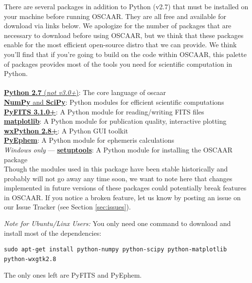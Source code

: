 \documentclass[a4paper]{article}
\begin{document}
There are several packages in addition to Python (v2.7) that must be installed on your machine before running OSCAAR. They are all free and available for download via links below. We apologize for the number of packages that are necessary to download before using OSCAAR, but we think that these packages enable for the most efficient open-source distro that we can provide.  We think you'll find that if you're going to build on the code within OSCAAR, this palette of packages provides most of the tools you need for scientific computation in Python. \\ \\
\noindent
\indent \href{http://www.python.org/getit/}{\textbf{Python 2.7} (\textit{not v3.0+})}: The core language of oscaar \\
\indent \href{http://new.scipy.org/download.html}{\textbf{NumPy} and \textbf{SciPy}}: Python modules for efficient scientific computations \\
\indent \href{http://www.stsci.edu/resources/software_hardware/pyfits/}{\textbf{PyFITS 3.1.0+}}: A Python module for reading/writing FITS files \\
\indent \href{http://matplotlib.sourceforge.net/index.html}{\textbf{matplotlib}}: A Python module for publication quality, interactive plotting\\
\indent \href{http://www.wxpython.org/download.php#stable}{\textbf{wxPython 2.8+}}: A Python GUI toolkit \\
\indent \href{http://rhodesmill.org/pyephem/}{\textbf{PyEphem}}: A Python module for ephemeris calculations\\
\indent \textit{Windows only} --- \href{https://pypi.python.org/pypi/setuptools}{\textbf{setuptools}}: A Python module for installing the OSCAAR package\\

\noindent Though the modules used in this package have been stable historically and probably will not go away any time soon, we want to note here that changes implemented in future versions of these packages could potentially break features in OSCAAR. If you notice a broken feature, let us know by posting an issue on our Issue Tracker (see Section \ref{sec:issues}).

\textit{Note for Ubuntu/Linx Users:} You only need one command to download and install most of the dependencies:
\begin{verbatim}
sudo apt-get install python-numpy python-scipy python-matplotlib python-wxgtk2.8
\end{verbatim}
The only ones left are PyFITS and PyEphem.
\end{document}
